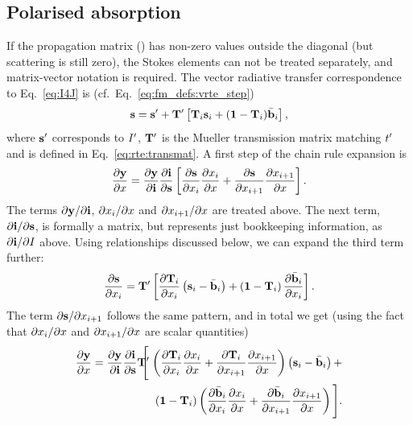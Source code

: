 \subsection{Polarised absorption}
\label{sec:wfuns:atmvars:pol}
%
If the propagation matrix (\ExtMat) has non-zero values outside the diagonal
(but scattering is still zero), the Stokes elements can not be treated
separately, and matrix-vector notation is required. The vector radiative
transfer correspondence to Eq.~\ref{eq:I4J} is
(cf.~Eq.~\ref{eq:fm_defs:vrte_step})
\begin{equation}
  \label{eq:s4J}
  {\bf s} = {\bf s}' + \mathbf{T}' \left[ \mathbf{T}_{i} {\bf s}_{i} +
         (\mathbf{1}-\mathbf{T}_{i})\bar{{\bf b}}_i \right],
\end{equation}
where ${\bf s}'$ corresponds to $I'$, $\mathbf{T}'$ is the Mueller
transmission matrix matching $t'$ and  is defined in
Eq.~\ref{eq:rte:transmat}. A first step of the chain rule expansion is
\begin{equation}
  \frac{\partial\mathbf{y}}{\partial x} =  
  \frac{\partial\mathbf{y}}{\partial\mathbf{i}}
  \frac{\partial\mathbf{i}}{\partial{\bf s}} 
  \left[ \frac{\partial{\bf s}}{\partial x_{i}}
         \frac{\partial x_{i}}{\partial x} +
         \frac{\partial{\bf s}}{\partial x_{i+1}}
         \frac{\partial x_{i+1}}{\partial x} 
  \right].
\end{equation}
The terms $\partial\mathbf{y}/\partial\mathbf{i}$, $\partial x_{i}/\partial x$
and $\partial x_{i+1}/\partial x$ are treated above. The next term,
$\partial\mathbf{i}/\partial{\bf s}$, is formally a matrix, but represents just
bookkeeping information, as $\partial\mathbf{i}/\partial I$ above. Using
relationships discussed below, we can expand the third term further:
\begin{equation}
  \frac{\partial{\bf s}}{\partial x_{i}} = \mathbf{T}'
  \left[
    \frac{\partial\mathbf{T}_{i}}{\partial x_{i}}
      \left( {\bf s}_{i}-\bar{{\bf b}}_i \right) +
    \left( \mathbf{1}-\mathbf{T}_{i} \right) 
      \frac{\partial\bar{{\bf b}}_i}{\partial x_{i}}
  \right].
\end{equation}
The term $\partial{\bf s}/\partial x_{i+1}$ follows the same pattern, and in
total we get (using the fact that $\partial x_{i}/\partial x$ and
$\partial x_{i+1}/\partial x$ are scalar quantities)
\begin{eqnarray}
  \frac{\PartD\MsrVct}{\PartD\SttElm} =  
  \frac{\PartD\MsrVct}{\PartD\MpiVct}
  \frac{\PartD\MpiVct}{\PartD\StoVec} \TrnMat'
  \!\!\!\!&\Bigg[&\!\!\!\!
    \left( 
      \frac{\PartD\aTrnMat{i}}{\PartD\aSttElm{i}}
      \frac{\PartD\aSttElm{i}}{\PartD\SttElm} +
      \frac{\PartD\aTrnMat{i}}{\PartD\aSttElm{i+1}}
      \frac{\PartD\aSttElm{i+1}}{\PartD\SttElm}
    \right)
    \left( \aStoVec{i}-\bar{\EmsVec}_i \right) + \nonumber\\ && \!\!\!
    \left( \IdnMtr-\aTrnMat{i} \right) 
    \left(
      \frac{\PartD\bar{\EmsVec}_i}{\PartD\aSttElm{i}} 
      \frac{\PartD\aSttElm{i}}{\PartD\SttElm} +
      \frac{\PartD\bar{\EmsVec}_i}{\PartD\aSttElm{i+1}} 
      \frac{\PartD\aSttElm{i+1}}{\PartD\SttElm}
    \right)
  \Bigg].
  \label{eq:chainrule2}
\end{eqnarray}
